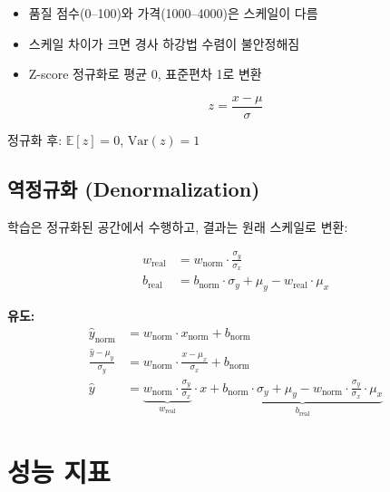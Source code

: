 \documentclass[11pt,a4paper]{article}
\begin{document}
\begin{itemize}
    \item 품질 점수(0--100)와 가격(1000--4000)은 스케일이 다름
    \item 스케일 차이가 크면 경사 하강법 수렴이 불안정해짐
    \item Z-score 정규화로 평균 0, 표준편차 1로 변환
\end{itemize}

\begin{tcolorbox}[colback=lightcyan,colframe=teal,title=\textbf{Z-score 정규화}]
\begin{equation}
z = \frac{x - \mu}{\sigma}
\end{equation}

정규화 후: $\mathbb{E}[z] = 0$, $\text{Var}(z) = 1$
\end{tcolorbox}

\subsection{역정규화 (Denormalization)}

학습은 정규화된 공간에서 수행하고, 결과는 원래 스케일로 변환:

\begin{tcolorbox}[colback=lightblue,colframe=darkblue,title=\textbf{가중치 역정규화}]
\begin{align}
w_{\text{real}} &= w_{\text{norm}} \cdot \frac{\sigma_y}{\sigma_x} \\[0.5em]
b_{\text{real}} &= b_{\text{norm}} \cdot \sigma_y + \mu_y - w_{\text{real}} \cdot \mu_x
\end{align}

\textbf{유도:}
\begin{align}
\hat{y}_{\text{norm}} &= w_{\text{norm}} \cdot x_{\text{norm}} + b_{\text{norm}} \\
\frac{\hat{y} - \mu_y}{\sigma_y} &= w_{\text{norm}} \cdot \frac{x - \mu_x}{\sigma_x} + b_{\text{norm}} \\
\hat{y} &= \underbrace{w_{\text{norm}} \cdot \frac{\sigma_y}{\sigma_x}}_{w_{\text{real}}} \cdot x + \underbrace{b_{\text{norm}} \cdot \sigma_y + \mu_y - w_{\text{norm}} \cdot \frac{\sigma_y}{\sigma_x} \cdot \mu_x}_{b_{\text{real}}}
\end{align}
\end{tcolorbox}

\section{ 성능 지표}
\end{document}
